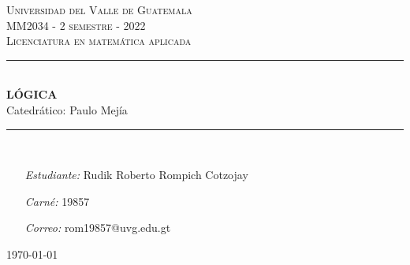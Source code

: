\begin{titlepage}
\thispagestyle{empty}
\newcommand{\HRule}{\rule{\linewidth}{0.5mm}}
\hspace{1cm}
\center

\textsc{\huge Universidad del Valle de Guatemala}\\[2.0cm]
\textsc{\Large MM2034 - 2 semestre - 2022}\\[0.8cm]
\MSonehalfspacing
\textsc{Licenciatura en matemática aplicada}\\[1.0cm]

\HRule\\[1.4cm]
\MSdoublespacing
{ \huge \bfseries LÓGICA}\\[0.2cm]
{ \large Catedrático: Paulo Mejía}\\[0.3cm] %
\HRule \\[2.4cm]
\MSonehalfspacing

\begin{minipage}[t]{0.8\textwidth}
	\begin{itemize}
	\item[\emph{Estudiante:}] Rudik Roberto Rompich Cotzojay
	\item[\emph{Carné:}] 19857
	\item[\emph{Correo:}] rom19857@uvg.edu.gt
	\end{itemize}
\end{minipage}

\vspace{2.9cm}

\flushright \today
\end{titlepage}
\restoregeometry

\tableofcontents
{}
\thispagestyle{empty}

\MSonehalfspacing
\newpage
\setcounter{page}{1}
\pagestyle{fancy}